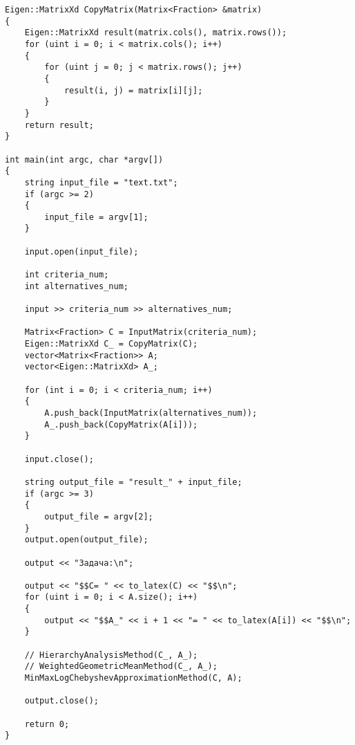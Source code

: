 \begin{lstlisting}
Eigen::MatrixXd CopyMatrix(Matrix<Fraction> &matrix)
{
    Eigen::MatrixXd result(matrix.cols(), matrix.rows());
    for (uint i = 0; i < matrix.cols(); i++)
    {
        for (uint j = 0; j < matrix.rows(); j++)
        {
            result(i, j) = matrix[i][j];
        }
    }
    return result;
}

int main(int argc, char *argv[])
{
    string input_file = "text.txt";
    if (argc >= 2)
    {
        input_file = argv[1];
    }

    input.open(input_file);

    int criteria_num;
    int alternatives_num;

    input >> criteria_num >> alternatives_num;

    Matrix<Fraction> C = InputMatrix(criteria_num);
    Eigen::MatrixXd C_ = CopyMatrix(C);
    vector<Matrix<Fraction>> A;
    vector<Eigen::MatrixXd> A_;

    for (int i = 0; i < criteria_num; i++)
    {
        A.push_back(InputMatrix(alternatives_num));
        A_.push_back(CopyMatrix(A[i]));
    }

    input.close();

    string output_file = "result_" + input_file;
    if (argc >= 3)
    {
        output_file = argv[2];
    }
    output.open(output_file);

    output << "Задача:\n";

    output << "$$C= " << to_latex(C) << "$$\n";
    for (uint i = 0; i < A.size(); i++)
    {
        output << "$$A_" << i + 1 << "= " << to_latex(A[i]) << "$$\n";
    }

    // HierarchyAnalysisMethod(C_, A_);
    // WeightedGeometricMeanMethod(C_, A_);
    MinMaxLogChebyshevApproximationMethod(C, A);

    output.close();

    return 0;
}
\end{lstlisting}
